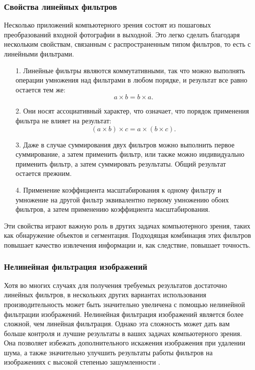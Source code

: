 \subsubsection{Свойства линейных фильтров}

Несколько приложений компьютерного зрения состоят из пошаговых преобразований входной фотографии в выходной. Это легко сделать благодаря \newline нескольким свойствам, связанным с распространенным типом фильтров, то есть с линейными фильтрами.
\begin{itemize}[leftmargin=1.6\parindent]
	\item[1.] Линейные фильтры являются коммутативными, так что можно выполнять операции умножения над фильтрами в любом порядке, и результат все равно остается тем же:
	\begin{equation}
		a \times b = b \times a.
	\end{equation}
	\item[2.] Они носят ассоциативный характер, что означает, что порядок применения фильтра не влияет на результат:
	\begin{equation}
		(a \times b) \times c = a \times (b \times c).
	\end{equation}
	\item[3.] Даже в случае суммирования двух фильтров можно выполнить первое суммирование, а затем применить фильтр, или также можно индивидуально применить фильтр, а затем суммировать результаты. Общий результат остается прежним.
	\item[4.] Применение коэффициента масштабирования к одному фильтру и умножение на другой фильтр
	эквивалентно первому умножению обоих фильтров, а затем применению коэффициента масштабирования.
\end{itemize}

Эти свойства играют важную роль в других задачах компьютерного зрения, таких как обнаружение объектов и сегментация. Подходящая комбинация этих фильтров повышает качество извлечения информации и, как следствие, повышает точность.

\subsubsection{Нелинейная фильтрация изображений}

Хотя во многих случаях для получения требуемых результатов достаточно линейных фильтров, в нескольких других вариантах использования производительность может быть значительно увеличена с помощью нелинейной фильтрации изображений. Нелинейная фильтрация изображений является более сложной, чем линейная фильтрация. Однако эта сложность может дать вам больше контроля и лучшие результаты в ваших задачах компьютерного зрения. Она позволяет избежать дополнительного искажения изображения при удалении шума, а также значительно улучшить результаты работы фильтров на изображениях с высокой степенью зашумленности \cite{impProc4}.

